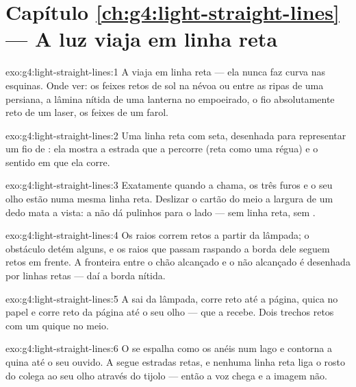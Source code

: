 \section*{Capítulo \ref{ch:g4:light-straight-lines} --- A luz viaja em linha reta}

\begin{solution}{exo:g4:light-straight-lines:1}
A  viaja em linha reta --- ela nunca faz curva nas esquinas.
Onde ver: os feixes retos de sol na névoa ou entre as ripas de uma
persiana, a lâmina nítida de uma lanterna no  empoeirado, o fio
absolutamente reto de um laser, os feixes de um farol.
\end{solution}

\begin{solution}{exo:g4:light-straight-lines:2}
Uma linha reta com seta, desenhada para representar um fio de :
ela mostra a estrada que a  percorre (reta como uma régua) e o
sentido em que ela corre.
\end{solution}

\begin{solution}{exo:g4:light-straight-lines:3}
Exatamente quando a chama, os três furos e o seu olho estão numa
mesma linha reta. Deslizar o cartão do meio a largura de um dedo mata
a vista: a  não dá pulinhos para o lado --- sem linha reta, sem
.
\end{solution}

\begin{solution}{exo:g4:light-straight-lines:4}
Os raios correm retos a partir da lâmpada; o obstáculo detém alguns,
e os raios que passam raspando a borda dele seguem retos em frente. A
fronteira entre o chão alcançado e o não alcançado é desenhada por
linhas retas --- daí a borda nítida.
\end{solution}

\begin{solution}{exo:g4:light-straight-lines:5}
A  sai da lâmpada, corre reto até a página, quica no papel e corre
reto da página até o seu olho --- que a recebe. Dois trechos retos
com um quique no meio.
\end{solution}

\begin{solution}{exo:g4:light-straight-lines:6}
O  se espalha como os anéis num lago e contorna a quina até o seu
ouvido. A  segue estradas retas, e nenhuma linha reta liga o rosto
do colega ao seu olho através do tijolo --- então a voz chega e a
imagem não.
\end{solution}

